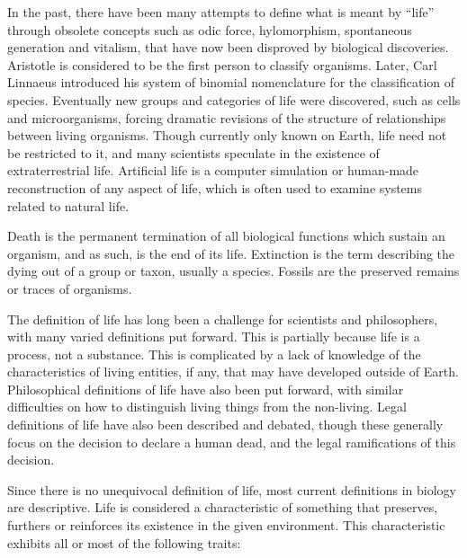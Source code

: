 In the past, there have been many attempts to define what is meant by ``life'' through obsolete concepts such as odic force, hylomorphism, spontaneous generation and vitalism, that have now been disproved by biological discoveries. Aristotle is considered to be the first person to classify organisms. Later, Carl Linnaeus introduced his system of binomial nomenclature for the classification of species. Eventually new groups and categories of life were discovered, such as cells and microorganisms, forcing dramatic revisions of the structure of relationships between living organisms. Though currently only known on Earth, life need not be restricted to it, and many scientists speculate in the existence of extraterrestrial life. Artificial life is a computer simulation or human-made reconstruction of any aspect of life, which is often used to examine systems related to natural life.

Death is the permanent termination of all biological functions which sustain an organism, and as such, is the end of its life. Extinction is the term describing the dying out of a group or taxon, usually a species. Fossils are the preserved remains or traces of organisms.

The definition of life has long been a challenge for scientists and philosophers, with many varied definitions put forward. This is partially because life is a process, not a substance. This is complicated by a lack of knowledge of the characteristics of living entities, if any, that may have developed outside of Earth. Philosophical definitions of life have also been put forward, with similar difficulties on how to distinguish living things from the non-living. Legal definitions of life have also been described and debated, though these generally focus on the decision to declare a human dead, and the legal ramifications of this decision.

Since there is no unequivocal definition of life, most current definitions in biology are descriptive. Life is considered a characteristic of something that preserves, furthers or reinforces its existence in the given environment. This characteristic exhibits all or most of the following traits:

